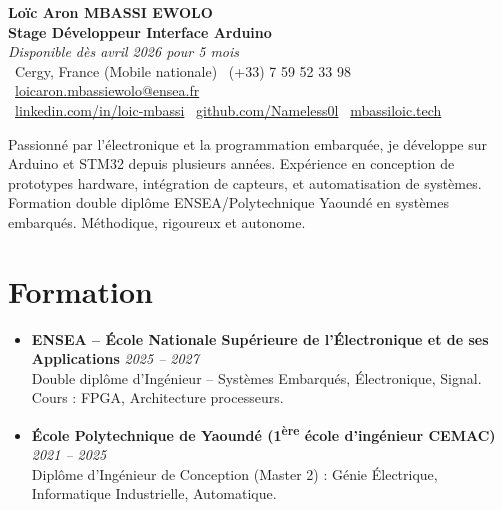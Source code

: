 \documentclass[a4paper,11pt]{article}
\begin{document}
\begin{center}
    {\Large \textbf{Loïc Aron MBASSI EWOLO}} \\ \vspace{4pt}
    \textbf{\large Stage Développeur Interface Arduino} \\
    \textit{\small Disponible dès avril 2026 pour 5 mois} \\ \vspace{4pt}
    \small
    \faMapMarker\ Cergy, France (Mobile nationale) \quad
    \faPhone\ (+33) 7 59 52 33 98 \quad
    {\color{primary}\faEnvelope\ \href{mailto:loicaron.mbassiewolo@ensea.fr}{loicaron.mbassiewolo@ensea.fr}} \\ \vspace{2pt}
    {\color{primary}\faLinkedin\ \href{https://www.linkedin.com/in/loic-mbassi/}{linkedin.com/in/loic-mbassi}} \quad
    {\color{primary}\faGithub\ \href{https://github.com/Nameless0l}{github.com/Nameless0l}} \quad
    {\color{primary}\faGlobe\ \href{https://mbassiloic.tech}{mbassiloic.tech}}
\end{center}

\vspace{-6pt}

\noindent\small{Passionné par l'électronique et la programmation embarquée, je développe sur Arduino et STM32 depuis plusieurs années. Expérience en conception de prototypes hardware, intégration de capteurs, et automatisation de systèmes. Formation double diplôme ENSEA/Polytechnique Yaoundé en systèmes embarqués. Méthodique, rigoureux et autonome.}

\section{Formation}
\begin{itemize}[leftmargin=*, label=\tiny$\bullet$, nosep]
    \item \textbf{ENSEA -- École Nationale Supérieure de l'Électronique et de ses Applications} \hfill \textit{2025 -- 2027} \\
    \small{Double diplôme d'Ingénieur -- Systèmes Embarqués, Électronique, Signal. Cours : FPGA, Architecture processeurs.}
    \item \textbf{École Polytechnique de Yaoundé (1\textsuperscript{ère} école d'ingénieur CEMAC)} \hfill \textit{2021 -- 2025} \\
    \small{Diplôme d'Ingénieur de Conception (Master 2) : Génie Électrique, Informatique Industrielle, Automatique.}
\end{itemize}
\end{document}
